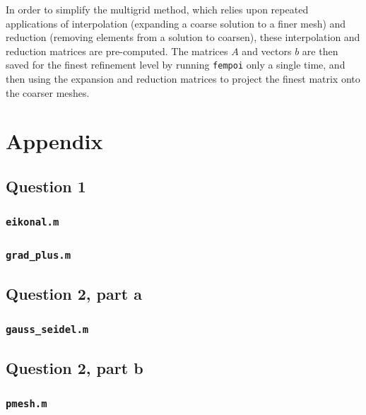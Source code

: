 \documentclass[10pt]{article}
\begin{document}
In order to simplify the multigrid method, which relies upon repeated applications of interpolation (expanding a coarse solution to a finer mesh) and reduction (removing elements from a solution to coarsen), these interpolation and reduction matrices are pre-computed. The matrices \(A\) and vectors \(b\) are then saved for the finest refinement level by running {\tt fempoi} only a single time, and then using the expansion and reduction matrices to project the finest matrix onto the coarser meshes.

\section{Appendix}
\subsection{Question 1}
\subsubsection{{\tt eikonal.m}}

\subsubsection{{\tt grad\_plus.m}}

\subsection{Question 2, part a}
\subsubsection{{\tt gauss\_seidel.m}}

\subsection{Question 2, part b}
\subsubsection{{\tt pmesh.m}}

\end{document}
